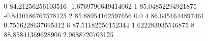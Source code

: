 0 84.21256256103516 -1.6769790649414062
1 85.04852294921875 -0.8410186767578125
2 85.88954162597656 0.0
4 86.6451644897461 0.7556228637695312
6 87.51182556152344 1.622283935546875
8 88.85841369628906 2.9688720703125
